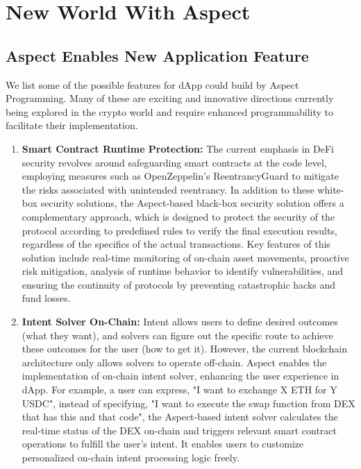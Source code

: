 \section{New World With Aspect}

\subsection{Aspect Enables New Application Feature}

We list some of the possible features for dApp could build by Aspect Programming. Many of these are exciting and innovative directions currently being explored in the crypto world and require enhanced programmability to facilitate their implementation. 

\begin{enumerate}
  \item \textbf{Smart Contract Runtime Protection:} The current emphasis in DeFi security revolves around safeguarding smart contracts at the code level, employing measures such as OpenZeppelin's ReentrancyGuard to mitigate the risks associated with unintended reentrancy. In addition to these white-box security solutions, the Aspect-based black-box security solution offers a complementary approach, which is designed to protect the security of the protocol according to predefined rules to verify the final execution results, regardless of the specifics of the actual transactions. Key features of this solution include real-time monitoring of on-chain asset movements, proactive risk mitigation, analysis of runtime behavior to identify vulnerabilities, and ensuring the continuity of protocols by preventing catastrophic hacks and fund losses.
  
  \item \textbf{Intent Solver On-Chain:} Intent allows users to define desired outcomes (what they want), and solvers can figure out the specific route to achieve these outcomes for the user (how to get it). However, the current blockchain architecture only allows solvers to operate off-chain. Aspect enables the implementation of on-chain intent solver, enhancing the user experience in dApp. For example, a user can express, "I want to exchange X ETH for Y USDC", instead of specifying, "I want to execute the swap function from DEX that has this and that code", the Aspect-based intent solver calculates the real-time status of the DEX on-chain and triggers relevant smart contract operations to fulfill the user's intent. It enables users to customize personalized on-chain intent processing logic freely.
  

\end{enumerate}
